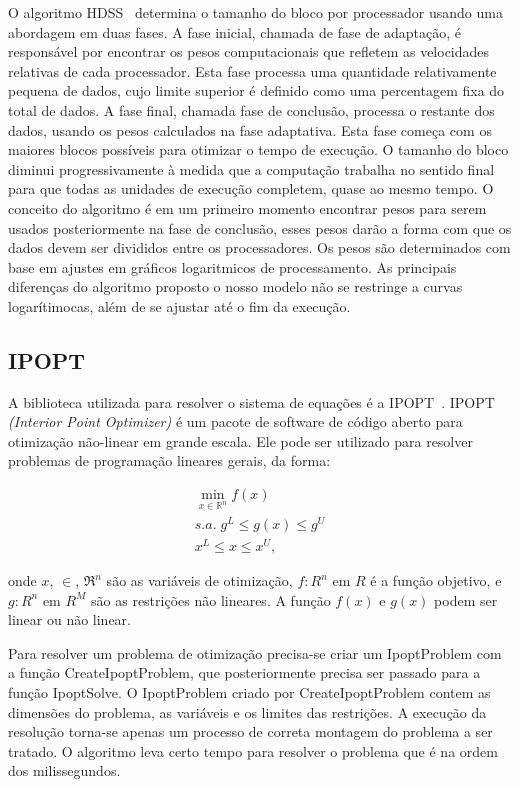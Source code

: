 O algoritmo HDSS~\citep{hdss} determina o tamanho do bloco por processador usando uma abordagem em duas fases. A fase inicial, chamada de fase de adaptação, é responsável por encontrar os pesos computacionais que refletem as velocidades relativas de cada processador. Esta fase processa uma quantidade relativamente pequena de dados, cujo limite superior é definido como uma percentagem fixa do total de dados. A fase final, chamada fase de conclusão, processa o restante dos dados, usando os pesos calculados na fase adaptativa. Esta fase começa com os maiores blocos possíveis para otimizar o tempo de execução. O tamanho do bloco diminui progressivamente à medida que a computação trabalha no sentido final para que todas as unidades de execução completem, quase ao mesmo tempo.  O conceito do algoritmo é em um primeiro momento encontrar pesos para serem usados posteriormente na fase de conclusão, esses pesos darão a forma com que os dados devem ser divididos entre os processadores.  Os pesos são determinados com base em ajustes em gráficos logaritmicos de processamento. As principais diferenças do algoritmo proposto o nosso modelo não se restringe a curvas logarítimocas, além de se ajustar até o fim da execução.



\subsection{IPOPT}

A biblioteca utilizada para resolver o sistema de equações é a IPOPT~\citep{point}. IPOPT \emph{(Interior Point Optimizer)} é um pacote de software de código aberto para otimização não-linear em grande escala. Ele pode ser utilizado para resolver problemas de programação lineares gerais, da forma:

\begin{eqnarray}
\displaystyle \min_{x\in\mathbb{R}^n} 
	\displaystyle f(x) \\
	s.a.\displaystyle \;  \nonumber 
	 	\displaystyle g^L \leq g(x) \leq g^U  \nonumber \\	
 	 	\displaystyle x^L \leq x \leq x^U, \nonumber 
\end{eqnarray}

onde $x$, $\in$, $\Re ^ n$ são as variáveis de otimização, $f : R^n$ em $R$ é a função objetivo, e $g: R^n$ em $R^M$ são as restrições não lineares. A função $f(x)$ e $g(x)$ podem ser linear ou não linear.  

Para resolver um problema de otimização precisa-se criar um IpoptProblem com a função CreateIpoptProblem, que posteriormente precisa ser passado para a função IpoptSolve. O IpoptProblem criado por CreateIpoptProblem contem as dimensões do problema, as variáveis e os limites das restrições. A execução da resolução torna-se apenas um processo de correta montagem do problema a ser tratado. O algoritmo leva certo tempo para resolver o problema que é na ordem dos milissegundos. 


